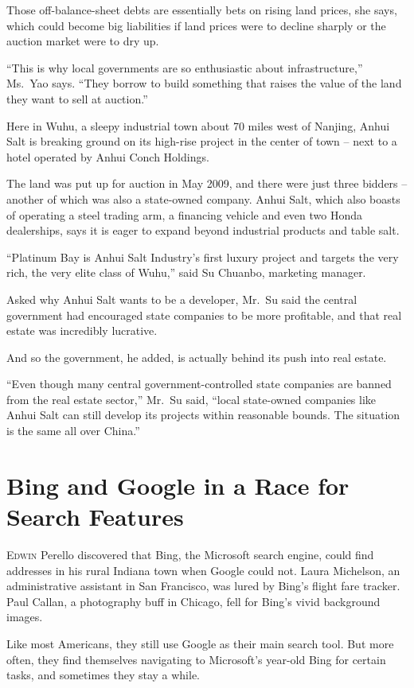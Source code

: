 ﻿\documentclass[12pt]{article}
\begin{document}
Those off-balance-sheet debts are essentially bets on rising land prices, she says, which could
become big liabilities if land prices were to decline sharply or the auction market were to dry up.

``This is why local governments are so enthusiastic about infrastructure,'' Ms.~Yao says. ``They
borrow to build something that raises the value of the land they want to sell at auction.''

Here in Wuhu, a sleepy industrial town about 70 miles west of Nanjing, Anhui Salt is breaking ground
on its high-rise project in the center of town -- next to a hotel operated by Anhui Conch Holdings.

The land was put up for auction in May 2009, and there were just three bidders -- another of which
was also a state-owned company. Anhui Salt, which also boasts of operating a steel trading arm, a
financing vehicle and even two Honda dealerships, says it is eager to expand beyond industrial
products and table salt.

``Platinum Bay is Anhui Salt Industry's first luxury project and targets the very rich, the very
elite class of Wuhu,'' said Su Chuanbo, marketing manager.

Asked why Anhui Salt wants to be a developer, Mr.~Su said the central government had encouraged
state companies to be more profitable, and that real estate was incredibly lucrative.

And so the government, he added, is actually behind its push into real estate.

``Even though many central government-controlled state companies are banned from the real estate
sector,'' Mr.~Su said, ``local state-owned companies like Anhui Salt can still develop its projects
within reasonable bounds. The situation is the same all over China.''

\section{Bing and Google in a Race for Search Features}

\lettrine{E}{dwin} Perello discovered that Bing, the Microsoft search
engine, could find addresses in his rural Indiana town when Google could not. Laura Michelson, an
administrative assistant in San Francisco, was lured by Bing's flight fare tracker. Paul Callan, a
photography buff in Chicago, fell for Bing's vivid background images.

Like most Americans, they still use Google as their main search tool. But more often, they find
themselves navigating to Microsoft's year-old Bing for certain tasks, and sometimes they stay a
while.
\end{document}
